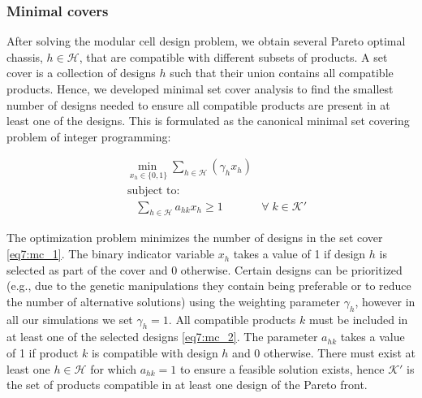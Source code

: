 {\subsubsection{Minimal covers} \label{sec:minimal_covers}
After solving the modular cell  design problem, we obtain several Pareto optimal chassis, $h \in \mathcal{H}$, that are compatible with different subsets of products. %
A set cover is a collection of designs $h$ such that their union contains all compatible products.
Hence, we developed minimal set cover analysis to find the smallest number of designs needed to ensure all compatible products are present in at least one of the designs.
This is formulated as the canonical minimal set covering problem of integer programming:

\begin{align}
    & \underset{ \;x_h \in \{0,1\}}{\min} \sum_{h \in \mathcal{H}} ( \gamma_h x_h) \label{eq7:mc_1}\\
    & \nonumber \; \text{subject to:} \\
    & \quad \sum_{h \in \mathcal{H}} a_{hk} x_h \ge 1 & \forall \; k \in \mathcal{K'} \label{eq7:mc_2}%
\end{align}

\noindent
The optimization problem minimizes the number of designs in the set cover \eqref{eq7:mc_1}.
The binary indicator variable $x_h$ takes a value of 1 if design $h$ is selected as part of the cover and 0 otherwise.
Certain designs can be prioritized (e.g., due to the genetic manipulations they contain being preferable or to reduce the number of alternative solutions) using the weighting parameter $\gamma_h$, however in all our simulations we set $\gamma_h = 1$. All compatible products $k$ must be included in at least one of the selected designs \eqref{eq7:mc_2}. The parameter $a_{hk}$ takes a value of 1 if product $k$ is compatible with design $h$ and 0 otherwise. There must exist at least one $h \in \mathcal{H}$ for which $a_{hk} = 1$ to ensure a feasible solution exists, hence $\mathcal{K'}$ is the set of products compatible in at least one design of the Pareto front.

}
